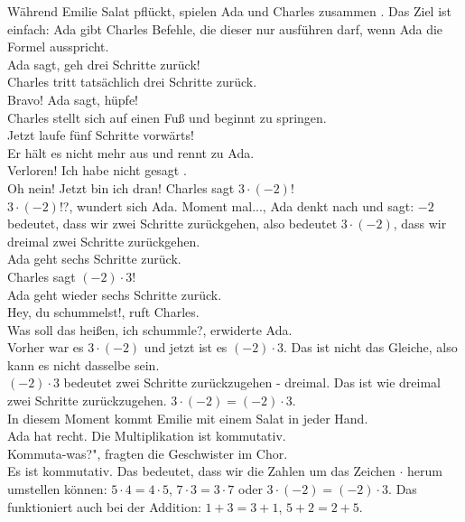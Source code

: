 Während Emilie Salat pflückt, spielen Ada und Charles zusammen . Das Ziel ist einfach: Ada gibt Charles Befehle, die dieser nur ausführen darf, wenn Ada die Formel  ausspricht.\\
\frqq{}Ada sagt, geh drei Schritte zurück!\flqq{}\\
Charles tritt tatsächlich drei Schritte zurück.\\
\frqq{}Bravo! Ada sagt, hüpfe!\flqq{}\\
Charles stellt sich auf einen Fuß und beginnt zu springen.\\
\frqq{}Jetzt laufe fünf Schritte vorwärts!\flqq{}\\
Er hält es nicht mehr aus und rennt zu Ada.\\
\frqq{}Verloren! Ich habe nicht gesagt .\flqq{}\\
\frqq{}Oh nein! Jetzt bin ich dran! Charles sagt $3 \cdot (-2)$!\flqq{}\\
\frqq{}$3 \cdot (-2)$!?\flqq{}, wundert sich Ada. \frqq{}Moment mal...\flqq{}, Ada denkt nach und sagt: \frqq{}$-2$ bedeutet, dass wir zwei Schritte zurückgehen, also bedeutet $3 \cdot (-2)$, dass wir dreimal zwei Schritte zurückgehen.\flqq{}\\
Ada geht sechs Schritte zurück.\\
\frqq{}Charles sagt $(-2) \cdot 3$!\flqq{}\\
Ada geht wieder sechs Schritte zurück.\\
\frqq{}Hey, du schummelst!\flqq{}, ruft Charles.\\
\frqq{}Was soll das heißen, ich schummle?\flqq{}, erwiderte Ada.\\
\frqq{}Vorher war es $3 \cdot (-2)$ und jetzt ist es $(-2) \cdot 3$. Das ist nicht das Gleiche, also kann es nicht dasselbe sein.\flqq{}\\
\frqq{}$(-2) \cdot 3$ bedeutet zwei Schritte zurückzugehen - dreimal. Das ist wie dreimal zwei Schritte zurückzugehen. $3 \cdot (-2) = (-2) \cdot 3$.\flqq{}\\
In diesem Moment kommt Emilie mit einem Salat in jeder Hand.\\
\frqq{}Ada hat recht. Die Multiplikation ist kommutativ.\flqq{}\\
\frqq{}Kommuta-was?", fragten die Geschwister im Chor.\flqq{}\\
\frqq{}Es ist kommutativ. Das bedeutet, dass wir die Zahlen um das Zeichen $\cdot$ herum umstellen können: $5 \cdot 4 = 4 \cdot 5$, $7 \cdot 3 = 3 \cdot 7$ oder $3 \cdot (-2) = (-2) \cdot 3$. Das funktioniert auch bei der Addition: $1 + 3 = 3 + 1$, $5 + 2 = 2 + 5$.\flqq{}\\
